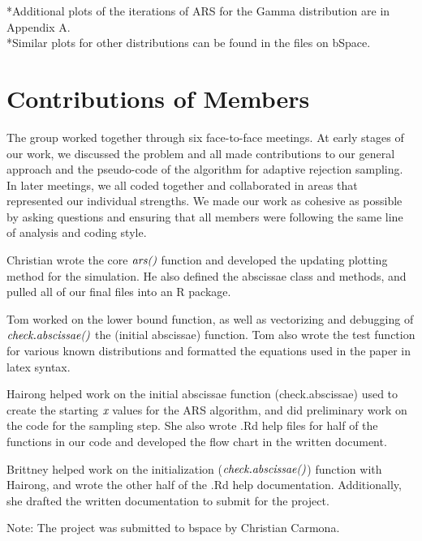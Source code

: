\documentclass{article}\usepackage[]{graphicx}\usepackage[]{color}
\begin{document}
*Additional plots of the iterations of ARS for the Gamma distribution are in Appendix A.\\
*Similar plots for other distributions can be found in the files on bSpace.

\section{Contributions of Members}
The group worked together through six face-to-face meetings.  At early stages of our work, we discussed the problem and all made contributions to our general approach and the pseudo-code of the algorithm for adaptive rejection sampling.  In later meetings, we all coded together and collaborated in areas that represented our individual strengths.  We made our work as cohesive as possible by asking questions and ensuring that all members were following the same line of analysis and coding style.

Christian wrote the core $\emph{ars()}$ function and developed the updating plotting method for the simulation.  He also defined the abscissae class and methods, and pulled all of our final files into an R package.

Tom worked on the lower bound function, as well as vectorizing and debugging of $\emph{check.abscissae()}$ the (initial abscissae) function. Tom also wrote the test function for various known distributions and formatted the equations used in the paper in latex syntax.

Hairong helped work on the initial abscissae function (check.abscissae) used to create the starting $\emph{x}$ values for the ARS algorithm, and did preliminary work on the code for the sampling step.  She also wrote .Rd help files for half of the functions in our code and developed the flow chart in the written document.

Brittney helped work on the initialization ($\emph{check.abscissae()}$) function with Hairong, and wrote the other half of the .Rd help documentation.  Additionally, she drafted the written documentation to submit for the project.


Note: The project was submitted to bspace by Christian Carmona.
\end{document}
